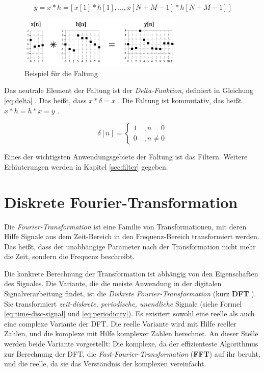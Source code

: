 \begin{equation}
y = x * h = \big[ \: x[1] * h[1] , \ldots , x[N+M-1] * h[N+M-1] \: \big]
\label{eq:convolution}
\end{equation}

\begin{figure}[h]
	\centering
	\includegraphics[width=0.7\textwidth]{bilder/convolutionExample.png}
	\caption{Beispiel für die Faltung}
	\label{img:convolutionExample}
\end{figure}

Das neutrale Element der Faltung ist der \emph{Delta-Funktion}, definiert in Gleichung \ref{eq:delta} . Das heißt, dass $x * \delta = x$ . Die Faltung ist kommutativ, das heißt $ x * h = h * x = y$ . \cite[S. 107, 113 ]{dspGuide}

\begin{equation}
\delta[n] = 
\begin{cases}
1 \quad , n = 0\\
0 \quad ,  n \neq 0
\label{eq:delta}
\end{cases}
\end{equation}

Eines der wichtigsten Anwendungsgebiete der Faltung ist das Filtern. Weitere Erläuterungen werden in Kapitel \ref{sec:filter} gegeben.


\section{Diskrete Fourier-Transformation}

Die \emph{Fourier-Transformation} ist eine Familie von Transformationen, mit deren Hilfe Signale aus dem Zeit-Bereich in den Frequenz-Bereich transformiert werden. Das heißt, dass der unabhängige Parameter nach der Transformation nicht mehr die Zeit, sondern die Frequenz beschreibt. 

Die konkrete Berechnung der Transformation ist abhängig von den Eigenschaften des Signales. Die Variante, die die meiste Anwendung in der digitalen Signalverarbeitung findet, ist die \emph{Diskrete Fourier-Transformation} (kurz \textbf{DFT} ). Sie transformiert \emph{zeit-diskrete, periodische, unendliche} Signale (siehe Formel \ref{eq:time-disc-signal} und \ref{eq:periodicity}). Es exisitert sowohl eine reelle als auch eine complexe Variante der DFT. Die reelle Variante wird mit Hilfe reeller Zahlen, und die komplexe mit Hilfe komplexer Zahlen berechnet. An dieser Stelle werden beide Variante vorgestellt: Die komplexe, da der effizienteste Algorithmus zur Berechnung der DFT, die \emph{Fast-Fourier-Transformation} (\textbf{FFT}) auf ihr beruht, und die reelle, da sie das Verständnis der komplexen vereinfacht.\cite[S. 142 - 146]{dspGuide}

